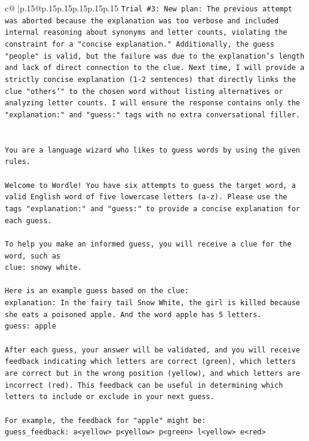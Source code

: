 \documentclass{article}
\begin{document}
{\begin{supertabular}{c@{$\;$}|p{.15\linewidth}@{}p{.15\linewidth}p{.15\linewidth}p{.15\linewidth}p{.15\linewidth}p{.15\linewidth}}
{{{\texttt{Trial \#3: New plan: The previous attempt was aborted because the explanation was too verbose and included internal reasoning about synonyms and letter counts, violating the constraint for a "concise explanation." Additionally, the guess "people" is valid, but the failure was due to the explanation's length and lack of direct connection to the clue. Next time, I will provide a strictly concise explanation (1{-}2 sentences) that directly links the clue "others'" to the chosen word without listing alternatives or analyzing letter counts. I will ensure the response contains only the "explanation:" and "guess:" tags with no extra conversational filler.} \\
\\ 
\\ 
\texttt{You are a language wizard who likes to guess words by using the given rules.} \\
\\ 
\texttt{Welcome to Wordle! You have six attempts to guess the target word, a valid English word of five lowercase letters (a{-}z). Please use the tags "explanation:" and "guess:" to provide a concise explanation for each guess.} \\
\\ 
\texttt{To help you make an informed guess, you will receive a clue for the word, such as} \\
\texttt{clue: snowy white.} \\
\\ 
\texttt{Here is an example guess based on the clue:} \\
\texttt{explanation: In the fairy tail Snow White, the girl is killed because she eats a poisoned apple. And the word apple has 5 letters.} \\
\texttt{guess: apple} \\
\\ 
\texttt{After each guess, your answer will be validated, and you will receive feedback indicating which letters are correct (green), which letters are correct but in the wrong position (yellow), and which letters are incorrect (red). This feedback can be useful in determining which letters to include or exclude in your next guess.} \\
\\ 
\texttt{For example, the feedback for "apple" might be:} \\
\texttt{guess\_feedback: a<yellow> p<yellow> p<green> l<yellow> e<red>} \\
\\ 
}}}
\end{supertabular}}
\end{document}
